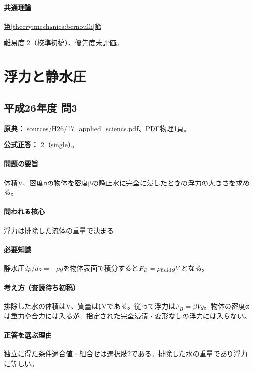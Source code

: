 \paragraph{共通理論} \hyperref[theory:mechanics:bernoulli]{第\ref*{theory:mechanics:bernoulli}節}

\par 難易度 2（校準初稿）、優先度未評価。

\section{浮力と静水圧}

\subsection{平成26年度 問3}
\label{q:h26-reg-applied-03}

\noindent\textbf{原典：} sources/H26/17\_applied\_science.pdf、PDF物理1頁。

\textbf{公式正答：} 2（single）。

\paragraph{問題の要旨} 体積V、密度αの物体を密度βの静止水に完全に浸したときの浮力の大きさを求める。

\paragraph{問われる核心} 浮力は排除した流体の重量で決まる

\paragraph{必要知識} 静水圧\(dp/dz=-\rho g\)を物体表面で積分すると\(F_B=\rho_{\rm fluid}gV\)となる。

\paragraph{考え方（査読待ち初稿）} 排除した水の体積はV、質量はβVである。従って浮力は\(F_B=\beta Vg\)。物体の密度αは重力や合力には入るが、指定された完全浸漬・変形なしの浮力には入らない。

\paragraph{正答を選ぶ理由} 独立に得た条件適合値・組合せは選択肢2である。排除した水の重量であり浮力に等しい。

